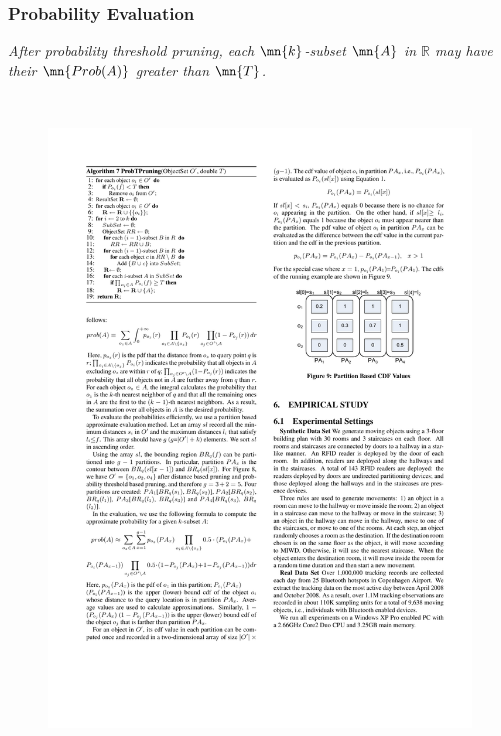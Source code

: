 
\begin{frame}
\frametitle{Probability Evaluation}

\textit{\textrm{After probability threshold pruning, each $\mn{k}$-subset $\mn{A}$ in $\mathbb{R}$ may have their $\mn{Prob(A)}$ greater than $\mn{T}$.}}
\\~\\
\begin{columns}[c]

    \begin{figure}[tb]
      \includegraphics[width=\columnwidth]{figures/2-3/2-3-10.pdf}
    \end{figure}


\end{columns}
\end{frame}
